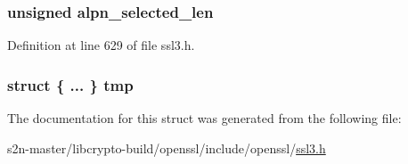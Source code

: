 \subsubsection[{\texorpdfstring{alpn\+\_\+selected\+\_\+len}{alpn_selected_len}}]{\setlength{\rightskip}{0pt plus 5cm}unsigned alpn\+\_\+selected\+\_\+len}\hypertarget{structssl3__state__st_a76a9039689d12a419672ea2b6796dcbf}{}\label{structssl3__state__st_a76a9039689d12a419672ea2b6796dcbf}


Definition at line 629 of file ssl3.\+h.

\subsubsection[{\texorpdfstring{tmp}{tmp}}]{\setlength{\rightskip}{0pt plus 5cm}struct \{ ... \}   tmp}\hypertarget{structssl3__state__st_ae70560dcf4b9288f112e86ddc015e425}{}\label{structssl3__state__st_ae70560dcf4b9288f112e86ddc015e425}


The documentation for this struct was generated from the following file\+:\begin{DoxyCompactItemize}
\item 
s2n-\/master/libcrypto-\/build/openssl/include/openssl/\hyperlink{include_2openssl_2ssl3_8h}{ssl3.\+h}\end{DoxyCompactItemize}
